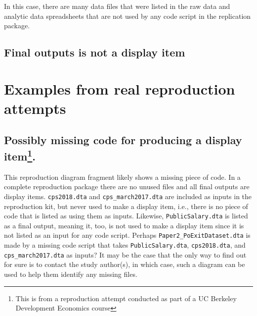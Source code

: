 \documentclass[
]{book}
\begin{document}
In this case, there are many data files that were listed in the raw data and analytic data spreadsheets that are not used by any code script in the replication package.

\hypertarget{final-outputs-is-not-a-display-item}{%
\subsection{Final outputs is not a display item}\label{final-outputs-is-not-a-display-item}}

\hypertarget{examples-from-real-reproduction-attempts}{%
\section{Examples from real reproduction attempts}\label{examples-from-real-reproduction-attempts}}

\hypertarget{possibly-missing-code-for-producing-a-display-item.}{%
\subsection[Possibly missing code for producing a display item.]{\texorpdfstring{Possibly missing code for producing a display item\footnote{This is from a reproduction attempt conducted as part of a UC Berkeley Development Economics course}.}{Possibly missing code for producing a display item.}}\label{possibly-missing-code-for-producing-a-display-item.}}

This reproduction diagram fragment likely shows a missing piece of code. In a complete reproduction package there are no unused files and all final outputs are display items. \texttt{cps2018.dta} and \texttt{cps\_march2017.dta} are included as inputs in the reproduction kit, but never used to make a display item, i.e., there is no piece of code that is listed as using them as inputs. Likewise, \texttt{PublicSalary.dta} is listed as a final output, meaning it, too, is not used to make a display item since it is not listed as an input for any code script. Perhaps \texttt{Paper2\_PoExitDataset.dta} is made by a missing code script that takes \texttt{PublicSalary.dta}, \texttt{cps2018.dta}, and \texttt{cps\_march2017.dta} as inputs? It may be the case that the only way to find out for sure is to contact the study author(s), in which case, such a diagram can be used to help them identify any missing files.
\end{document}
